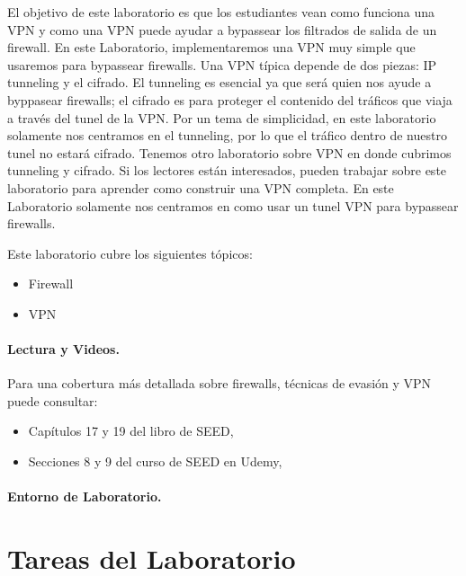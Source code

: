 El objetivo de este laboratorio es que los estudiantes vean como funciona una VPN y como una VPN puede ayudar a bypassear los filtrados de salida de un firewall.
En este Laboratorio, implementaremos una VPN muy simple que usaremos para bypassear firewalls. Una VPN típica depende de dos piezas: IP tunneling y el cifrado. El tunneling es esencial ya que será quien nos ayude a byppasear firewalls; el cifrado es para proteger el contenido del tráficos que viaja a través del tunel de la VPN.
Por un tema de simplicidad, en este laboratorio solamente nos centramos en el tunneling, por lo que el tráfico dentro de nuestro tunel no estará cifrado. Tenemos otro laboratorio sobre VPN en donde cubrimos tunneling y cifrado. Si los lectores están interesados, pueden trabajar sobre este laboratorio para aprender como construir una VPN completa. En este Laboratorio solamente nos centramos en como usar un tunel VPN para bypassear firewalls.

Este laboratorio cubre los siguientes tópicos:

\begin{itemize}[noitemsep]
\item Firewall
\item VPN
\end{itemize}


\paragraph{Lectura y Videos.}
Para una cobertura más detallada sobre firewalls, técnicas de evasión y VPN puede consultar:

\begin{itemize}
\item Capítulos 17 y 19 del libro de SEED, \seedbook
\item Secciones 8 y 9 del curso de SEED en Udemy, \seedisvideo
\end{itemize}


\paragraph{Entorno de Laboratorio.} \seedenvironmentB
 


\section{Tareas del Laboratorio}




